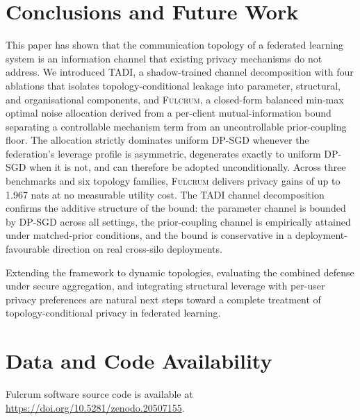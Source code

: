 \documentclass[letterpaper,journal]{IEEEtran}
\newcommand{\TADI}{\textsc{TADI}\xspace}
\newcommand{\Fulcrum}{\textsc{Fulcrum}\xspace}
\begin{document}
\section{Conclusions and Future Work}
\label{sec:conclusion}

This paper has shown that the communication topology of a federated
learning system is an information channel that existing privacy
mechanisms do not address. We introduced \TADI, a shadow-trained
channel decomposition with four ablations that isolates
topology-conditional leakage into parameter, structural, and
organisational components, and \Fulcrum, a closed-form balanced
min-max optimal noise allocation derived from a per-client
mutual-information bound separating a controllable mechanism term
from an uncontrollable prior-coupling floor. The allocation strictly
dominates uniform DP-SGD whenever the federation's leverage profile
is asymmetric, degenerates exactly to uniform DP-SGD when it is
not, and can therefore be adopted unconditionally. Across three
benchmarks and six topology families, \Fulcrum delivers privacy
gains of up to 1.967 nats at no measurable utility cost. The \TADI
channel decomposition confirms the additive structure of the bound:
the parameter channel is bounded by DP-SGD across all settings, the
prior-coupling channel is empirically attained under matched-prior
conditions, and the bound is conservative in a deployment-favourable
direction on real cross-silo deployments.

Extending the framework to dynamic topologies, evaluating the
combined defense under secure aggregation, and integrating structural
leverage with per-user privacy preferences are natural next steps
toward a complete treatment of topology-conditional privacy in
federated learning.

\section*{Data and Code Availability}
\noindent Fulcrum software source code is available at
\url{https://doi.org/10.5281/zenodo.20507155}.

\end{document}
